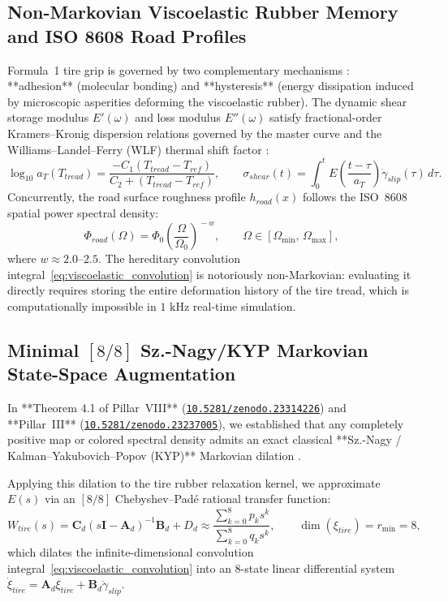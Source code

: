 \documentclass[11pt,a4paper,reqno]{article}
\def\bm#1{#1}%
\def\mathrm#1{#1}%
\newcommand{\zenodo}[1]{\href{https://doi.org/10.5281/zenodo.#1}{\nolinkurl{10.5281/zenodo.#1}}}
\theoremstyle{plain}
\theoremstyle{definition}
\theoremstyle{remark}
\numberwithin{equation}{section}
\begin{document}
\subsection{Non-Markovian Viscoelastic Rubber Memory and ISO 8608 Road Profiles}
Formula~1 tire grip is governed by two complementary mechanisms \cite{Persson2001}: **adhesion** (molecular bonding) and **hysteresis** (energy dissipation induced by microscopic asperities deforming the viscoelastic rubber). The dynamic shear storage modulus $E'(\omega)$ and loss modulus $E''(\omega)$ satisfy fractional-order Kramers--Kronig dispersion relations governed by the master curve and the Williams--Landel--Ferry (WLF) thermal shift factor \cite{Grosch1959}:
\begin{equation}
  \log_{10} a_T(T_{\mathrm{tread}}) = \frac{-C_1\left(T_{\mathrm{tread}} - T_{\mathrm{ref}}\right)}{C_2 + \left(T_{\mathrm{tread}} - T_{\mathrm{ref}}\right)}, \qquad \sigma_{\mathrm{shear}}(t) = \int_0^t E\!\left(\frac{t - \tau}{a_T}\right) \dot{\gamma}_{\mathrm{slip}}(\tau)\,d\tau.
  \label{eq:viscoelastic_convolution}
\end{equation}
Concurrently, the road surface roughness profile $h_{\mathrm{road}}(x)$ follows the ISO~8608 spatial power spectral density:
\begin{equation}
  \Phi_{\mathrm{road}}(\Omega) = \Phi_0 \left(\frac{\Omega}{\Omega_0}\right)^{\!-w}, \qquad \Omega \in [\Omega_{\min},\, \Omega_{\max}],
  \label{eq:iso8608_psd}
\end{equation}
where $w \approx 2.0\text{--}2.5$. The hereditary convolution integral~\eqref{eq:viscoelastic_convolution} is notoriously non-Markovian: evaluating it directly requires storing the entire deformation history of the tire tread, which is computationally impossible in $1\text{ kHz}$ real-time simulation.

\subsection{\texorpdfstring{Minimal $[8/8]$ Sz.-Nagy/KYP Markovian State-Space Augmentation}{Minimal [8/8] Sz.-Nagy/KYP Markovian State-Space Augmentation}}
In **Theorem 4.1 of Pillar~VIII** (\zenodo{23314226}) and **Pillar~III** (\zenodo{23237005}), we established that any completely positive map or colored spectral density admits an exact classical **Sz.-Nagy / Kalman--Yakubovich--Popov (KYP)** Markovian dilation \cite{SzNagyFoias1970}. 

Applying this dilation to the tire rubber relaxation kernel, we approximate $E(s)$ via an $[8/8]$ Chebyshev--Pad\'{e} rational transfer function:
\begin{equation}
  W_{\mathrm{tire}}(s) = \mathbf{C}_d\left(s\mathbf{I} - \mathbf{A}_d\right)^{-1}\mathbf{B}_d + D_d \approx \frac{\sum_{k=0}^8 p_k s^k}{\sum_{k=0}^8 q_k s^k}, \qquad \dim(\bm{\xi}_{\mathrm{tire}}) = r_{\min} = 8,
  \label{eq:sznagy_f1_augmentation}
\end{equation}
which dilates the infinite-dimensional convolution integral~\eqref{eq:viscoelastic_convolution} into an 8-state linear differential system $\dot{\bm{\xi}}_{\mathrm{tire}} = \mathbf{A}_d \bm{\xi}_{\mathrm{tire}} + \mathbf{B}_d \dot{\gamma}_{\mathrm{slip}}$.
\end{document}

